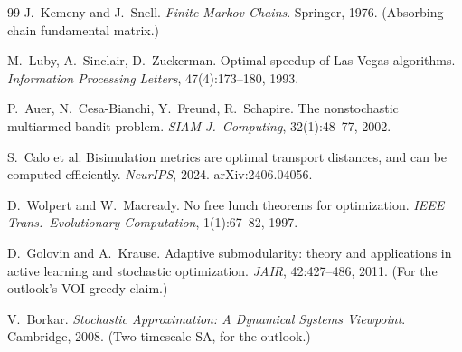 \documentclass[11pt]{article}
\theoremstyle{plain}
\theoremstyle{definition}
\theoremstyle{remark}
\begin{document}
\begin{thebibliography}{99}
 J.~Kemeny and J.~Snell.
\emph{Finite Markov Chains}. Springer, 1976. (Absorbing-chain fundamental
matrix.)

 M.~Luby, A.~Sinclair, D.~Zuckerman.
Optimal speedup of Las Vegas algorithms.
\emph{Information Processing Letters}, 47(4):173--180, 1993.

 P.~Auer, N.~Cesa-Bianchi, Y.~Freund, R.~Schapire.
The nonstochastic multiarmed bandit problem.
\emph{SIAM J.\ Computing}, 32(1):48--77, 2002.

 S.~Calo et al.
Bisimulation metrics are optimal transport distances, and can be computed
efficiently. \emph{NeurIPS}, 2024. arXiv:2406.04056.

 D.~Wolpert and W.~Macready.
No free lunch theorems for optimization.
\emph{IEEE Trans.\ Evolutionary Computation}, 1(1):67--82, 1997.

 D.~Golovin and A.~Krause.
Adaptive submodularity: theory and applications in active learning and
stochastic optimization. \emph{JAIR}, 42:427--486, 2011. (For the outlook's
VOI-greedy claim.)

 V.~Borkar.
\emph{Stochastic Approximation: A Dynamical Systems Viewpoint}. Cambridge,
2008. (Two-timescale SA, for the outlook.)

\end{thebibliography}
\end{document}
